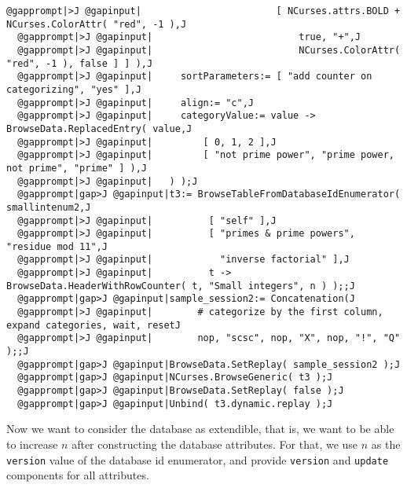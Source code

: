 \documentclass[a4paper,11pt]{report}
\begin{document}
{{\begin{Verbatim}[commandchars=@|J,fontsize=\small,frame=single,label=Example]
  @gapprompt|>J @gapinput|                        [ NCurses.attrs.BOLD + NCurses.ColorAttr( "red", -1 ),J
  @gapprompt|>J @gapinput|                          true, "+",J
  @gapprompt|>J @gapinput|                          NCurses.ColorAttr( "red", -1 ), false ] ] ),J
  @gapprompt|>J @gapinput|     sortParameters:= [ "add counter on categorizing", "yes" ],J
  @gapprompt|>J @gapinput|     align:= "c",J
  @gapprompt|>J @gapinput|     categoryValue:= value -> BrowseData.ReplacedEntry( value,J
  @gapprompt|>J @gapinput|         [ 0, 1, 2 ],J
  @gapprompt|>J @gapinput|         [ "not prime power", "prime power, not prime", "prime" ] ),J
  @gapprompt|>J @gapinput|   ) );J
  @gapprompt|gap>J @gapinput|t3:= BrowseTableFromDatabaseIdEnumerator( smallintenum2,J
  @gapprompt|>J @gapinput|          [ "self" ],J
  @gapprompt|>J @gapinput|          [ "primes & prime powers", "residue mod 11",J
  @gapprompt|>J @gapinput|            "inverse factorial" ],J
  @gapprompt|>J @gapinput|          t -> BrowseData.HeaderWithRowCounter( t, "Small integers", n ) );;J
  @gapprompt|gap>J @gapinput|sample_session2:= Concatenation(J
  @gapprompt|>J @gapinput|        # categorize by the first column, expand categories, wait, resetJ
  @gapprompt|>J @gapinput|        nop, "scsc", nop, "X", nop, "!", "Q" );;J
  @gapprompt|gap>J @gapinput|BrowseData.SetReplay( sample_session2 );J
  @gapprompt|gap>J @gapinput|NCurses.BrowseGeneric( t3 );J
  @gapprompt|gap>J @gapinput|BrowseData.SetReplay( false );J
  @gapprompt|gap>J @gapinput|Unbind( t3.dynamic.replay );J
\end{Verbatim}
 Now we want to consider the database as extendible, that is, we want to be
able to increase $n$ after constructing the database attributes. For that, we use $n$ as the \texttt{version} value of the database id enumerator, and provide \texttt{version} and \texttt{update} components for all attributes. 

}}
\end{document}
